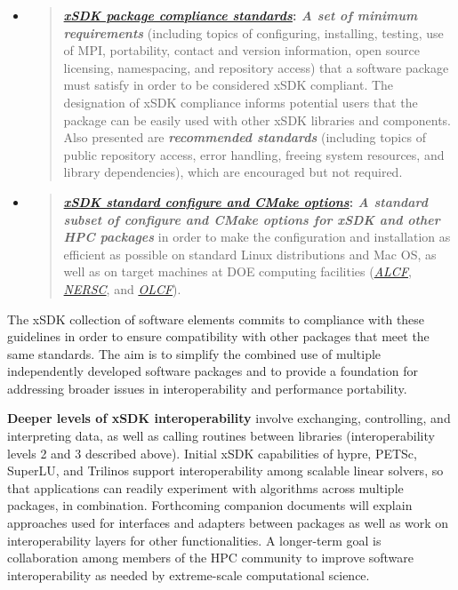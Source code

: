 \documentclass[]{article}
\begin{document}
\begin{itemize}
\item
  \begin{quote}
  \textbf{\href{https://docs.google.com/document/d/1DCx2Duijb0COESCuxwEEK1j0BPe2cTIJ-AjtJxt3290/edit\#heading=h.3hcywq83w3x0}{\emph{xSDK
  package compliance standards}}: \emph{A set of minimum requirements}}
  (including topics of configuring, installing, testing, use of MPI,
  portability, contact and version information, open source licensing,
  namespacing, and repository access) that a software package must
  satisfy in order to be considered xSDK compliant. The designation of
  xSDK compliance informs potential users that the package can be easily
  used with other xSDK libraries and components. Also presented are
  \emph{\textbf{recommended standards}} (including topics of public
  repository access, error handling, freeing system resources, and
  library dependencies), which are encouraged but not required.
  \end{quote}
\item
  \begin{quote}
  \textbf{\href{https://docs.google.com/document/d/18028D6nsuhIrCvJnX6c07r8m_Np4SH-aGXMX4svMs1w/edit\#heading=h.3hcywq83w3x0}{\emph{xSDK
  standard configure and CMake options}}: \emph{A standard subset of
  configure and CMake options for xSDK and other HPC packages}} in order
  to make the configuration and installation as efficient as possible on
  standard Linux distributions and Mac OS, as well as on target machines
  at DOE computing facilities
  (\href{http://www.alcf.anl.gov/}{\emph{ALCF}},
  \href{http://www.nersc.gov/}{\emph{NERSC}}, and
  \href{https://www.olcf.ornl.gov/}{\emph{OLCF}}).
  \end{quote}
\end{itemize}

The xSDK collection of software elements commits to compliance with
these guidelines in order to ensure compatibility with other packages
that meet the same standards. The aim is to simplify the combined use of
multiple independently developed software packages and to provide a
foundation for addressing broader issues in interoperability and
performance portability.

\textbf{Deeper levels of xSDK interoperability} involve exchanging,
controlling, and interpreting data, as well as calling routines between
libraries (interoperability levels 2 and 3 described above). Initial
xSDK capabilities of hypre, PETSc, SuperLU, and Trilinos support
interoperability among scalable linear solvers, so that applications can
readily experiment with algorithms across multiple packages, in
combination. Forthcoming companion documents will explain approaches
used for interfaces and adapters between packages as well as work on
interoperability layers for other functionalities. A longer-term goal is
collaboration among members of the HPC community to improve software
interoperability as needed by extreme-scale computational science.
\end{document}
